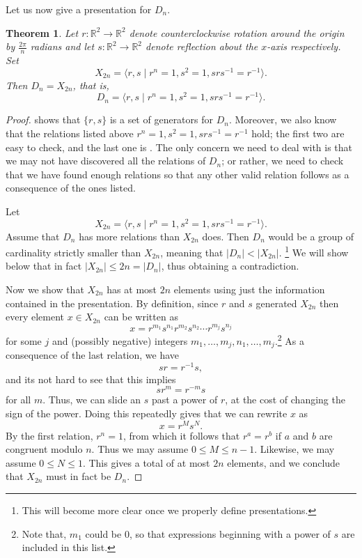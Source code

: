\documentclass[12pt]{report}
\newtheorem{theorem}{Theorem}[chapter]
\numberwithin{equation}{section}
\numberwithin{theorem}{chapter}
\theoremstyle{definition}
\newtheorem*{basic properties}{Basic Properties}
\newtheorem*{Important Remark}{Important Remark}
\begin{document}
Let us now give a presentation for $D_n$.






\begin{theorem}\label{presentation for D_n}
Let $r:\mathbb{R}^2\to\mathbb{R}^2$ denote counterclockwise rotation around the origin by $\frac{2\pi}{n}$ radians and let $s:\mathbb{R}^2\to\mathbb{R}^2$ denote reflection about the $x$-axis respectively. Set 
$$X_{2n}=\langle r,s \mid r^n = 1, s^2 = 1, srs^{-1} = r^{-1} \rangle.$$ 
Then $D_n=X_{2n}$, that is,
$$
D_n = \langle r,s \mid r^n = 1, s^2 = 1, srs^{-1} = r^{-1} \rangle.
$$
\end{theorem}

\begin{proof}
 shows that $\{r,s\}$ is a set of generators for $D_n$. Moreover, we also know that the relations listed above $r^n = 1, s^2 = 1, srs^{-1} = r^{-1}$ hold; the first two are easy to check, and the last one is .  The only concern we need to deal with is that we may not have discovered all the relations of $D_n$; or rather, we need to check that we have found enough relations so that any other valid relation follows as a consequence of the ones listed. 

Let
$$X_{2n}=\langle r,s \mid r^n = 1, s^2 = 1, srs^{-1} = r^{-1} \rangle.$$
Assume that $D_n$ has more relations than $X_{2n}$ does. Then $D_n$ would be a group of cardinality strictly smaller than  $X_{2n}$, meaning that $|D_n|<|X_{2n}|$. \footnote{This will become more clear once we properly define presentations.}
We will show below that in fact $|X_{2n}|\leqslant 2n=|D_n|$, thus obtaining a contradiction.

Now we show that $X_{2n}$ has at most $2n$ elements using just the information contained in the presentation. By definition, since $r$ and $s$ generated $X_{2n}$ then every element $x\in X_{2n}$ can be written as 
$$x = r^{m_1} s^{n_1} r^{m_2} s^{n_2} \cdots r^{m_j} s^{n_j}$$ 
for some $j$ and (possibly negative) integers $m_1, \dots, m_j, n_1, \dots, m_j$.\footnote{Note that,
$m_1$ could be $0$, so that expressions beginning with a power of $s$ are included in this list.} 
As a consequence of the last relation, we have
$$sr = r^{-1}s,$$
and its not hard to see that this implies
$$sr^m = r^{-m} s$$
for all $m$. 
Thus, we can slide an $s$ past a power of $r$, at the cost of changing the sign of the power. Doing this repeatedly gives that we can rewrite $x$ as 
$$x = r^M s^N.$$
By the first relation, $r^n = 1$, from which it follows that $r^a = r^b$ if $a$ and $b$ are congruent modulo $n$. Thus we may assume $0 \leqslant M \leqslant n-1$. Likewise, we may assume $0 \leqslant N \leqslant 1$. This gives a total of at most $2n$ elements, and we conclude that $X_{2n}$ must in fact be $D_n$.
\end{proof}
\end{document}
